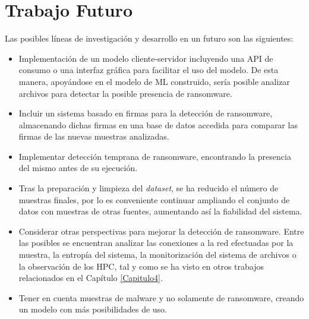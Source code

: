 \section{Trabajo Futuro}
\noindent Las posibles líneas de investigación y desarrollo en un futuro son las siguientes:

\begin{itemize}
    \item Implementación de un modelo cliente-servidor incluyendo una \gls{API} de consumo o una interfaz gráfica para facilitar el uso del modelo. De esta manera, apoyándose en el modelo de \gls{ML} construido, sería posible analizar archivos para detectar la posible presencia de ransomware.
    \item Incluir un sistema basado en firmas para la detección de ransomware, almacenando dichas firmas en una base de datos accedida para comparar las firmas de las nuevas muestras analizadas.
    \item Implementar detección temprana de ransomware, encontrando la presencia del mismo antes de su ejecución.
    \item Tras la preparación y limpieza del \textit{dataset}, se ha reducido el número de muestras finales, por lo es conveniente continuar ampliando el conjunto de datos con muestras de otras fuentes, aumentando así la fiabilidad del sistema.
    \item Considerar otras perspectivas para mejorar la detección de ransomware. Entre las posibles se encuentran analizar las conexiones a la red efectuadas por la muestra, la entropía del sistema, la monitorización del sistema de archivos o la observación de los \gls{HPC}, tal y como se ha visto en otros trabajos relacionados en el Capítulo \ref{Capitulo4}.
    \item Tener en cuenta muestras de malware y no solamente de ransomware, creando un modelo con más posibilidades de uso.
\end{itemize}